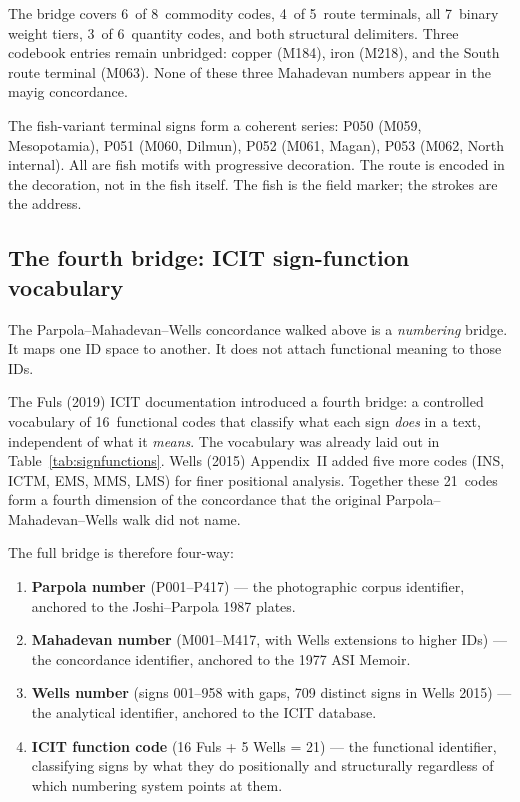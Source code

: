 \noindent
The bridge covers 6~of 8~commodity codes, 4~of 5~route terminals,
all 7~binary weight tiers, 3~of 6~quantity codes, and both
structural delimiters.
Three codebook entries remain unbridged: copper (M184), iron (M218),
and the South route terminal (M063).
None of these three Mahadevan numbers appear in the mayig
concordance.

The fish-variant terminal signs form a coherent series: P050 (M059,
Mesopotamia), P051 (M060, Dilmun), P052 (M061, Magan), P053 (M062,
North internal). All are fish motifs with progressive decoration.
The route is encoded in the decoration, not in the fish itself.
The fish is the field marker; the strokes are the address.

\subsection*{The fourth bridge: ICIT sign-function vocabulary}

The Parpola--Mahadevan--Wells concordance walked above is a
\emph{numbering} bridge. It maps one ID space to another. It does
not attach functional meaning to those IDs.

The Fuls (2019) ICIT documentation introduced a fourth bridge: a
controlled vocabulary of 16~functional codes that classify what
each sign \emph{does} in a text, independent of what it
\emph{means}. The vocabulary was already laid out in
Table~\ref{tab:signfunctions}. Wells (2015) Appendix~II added five
more codes (INS, ICTM, EMS, MMS, LMS) for finer positional
analysis. Together these 21~codes form a fourth dimension of the
concordance that the original Parpola--Mahadevan--Wells walk did
not name.

The full bridge is therefore four-way:

\begin{enumerate}[nosep]
\item \textbf{Parpola number} (P001--P417) --- the photographic
  corpus identifier, anchored to the Joshi--Parpola 1987 plates.
\item \textbf{Mahadevan number} (M001--M417, with Wells extensions
  to higher IDs) --- the concordance identifier, anchored to the
  1977 ASI Memoir.
\item \textbf{Wells number} (signs 001--958 with gaps, 709 distinct
  signs in Wells 2015) --- the analytical identifier, anchored to
  the ICIT database.
\item \textbf{ICIT function code} (16 Fuls + 5 Wells = 21) --- the
  functional identifier, classifying signs by what they do
  positionally and structurally regardless of which numbering
  system points at them.
\end{enumerate}

